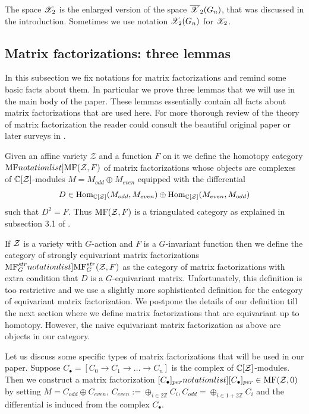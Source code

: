 \documentclass[10pt]{amsart}
\def\ZZ{\mathbb{Z} }
\begin{document}
The space \(\mathscr{X}_2\) is the enlarged version of the space \(\overline{\mathscr{X}}_2(G_n)\), that was discussed in the introduction. Sometimes we use notation \(\mathscr{X}_2(G_n)\) for
\(\mathscr{X}_2\).

\def\yHom{ \Hom }

\subsection{Matrix factorizations: three lemmas} In this subsection we fix notations for matrix factorizations and remind some basic facts about them.
In particular we prove three lemmas that we will use in the main body of the paper. These lemmas essentially contain all facts about matrix factorizations
that are used here. For more thorough review of the theory of matrix factorization the reader could consult the beautiful original paper \cite{E} or later surveys in \cite{D}.


Given an affine variety $\mathcal{Z}$ and a function $F$ on it we define \cite{E} the homotopy category $\SymbolPrint{\MFs}(\mathcal{Z},F)$ of matrix factorizations whose objects are complexes of $\mathbb{C}[\mathcal{Z}]$-modules
$M=M_{odd}\oplus M_{even}$ equipped with the differential \[D\in \yHom_{\CC[\calZ]}(M_{odd},M_{even})\oplus  \yHom_{\CC[\calZ]}(M_{even},M_{odd})\] such that $D^2=F$.
Thus $\mathrm{MF}(\mathcal{Z},F)$ is a triangulated category as explained in subsection 3.1 of \cite{Or}.

If $\mathcal{Z}$ is a variety with $G$-action  and $F$ is a $G$-invariant function then
we define the category of strongly  equivariant matrix factorizations $\SymbolPrint{\MFs^{str}_G}(\mathcal{Z},F)$ as the category of matrix factorizations with extra condition  that $D$ is a $G$-equivariant matrix.
Unfortunately, this definition is too restrictive and we use a slightly more sophisticated definition for the category of  equivariant matrix factorization. We postpone the details of our definition till the next section
where we define matrix factorizations that are equivariant up to homotopy.
However, the naive equivariant matrix factorization as above are objects in our category.

Let us discuss some specific types of matrix factorizations that will be used in our paper. Suppose $C_\bullet=[C_0\to C_1\to\dots \to C_n]$ is the complex of $\mathbb{C}[\mathcal{Z}]$-modules.
Then we construct a matrix factorization $\SymbolPrint{[C_\bullet]_{per}}\in \MFs(\calZ,0)$ by setting $M=C_{odd}\oplus C_{even}$,
$C_{even}:=\oplus_{i\in 2\ZZ} C_i, C_{odd}= \oplus_{i\in 1+2\ZZ} C_i$ and the differential is induced from the complex $C_\bullet$.
\end{document}
